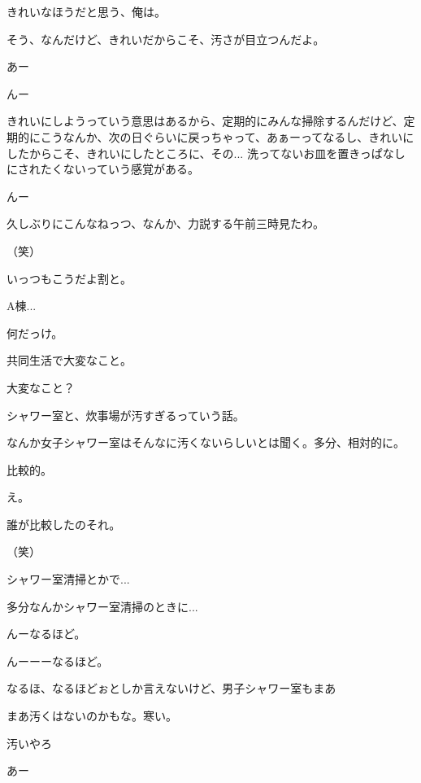 \begin{multicols}{3}
{        きれいなほうだと思う、俺は。

        そう、なんだけど、きれいだからこそ、汚さが目立つんだよ。

        あー

        んー

        きれいにしようっていう意思はあるから、定期的にみんな掃除するんだけど、定期的にこうなんか、次の日ぐらいに戻っちゃって、あぁーってなるし、きれいにしたからこそ、きれいにしたところに、その... 洗ってないお皿を置きっぱなしにされたくないっていう感覚がある。

        んー

        久しぶりにこんなねっつ、なんか、力説する午前三時見たわ。

        （笑）

        いっつもこうだよ割と。

        A棟...

        何だっけ。

        共同生活で大変なこと。

        大変なこと？

        シャワー室と、炊事場が汚すぎるっていう話。

        なんか女子シャワー室はそんなに汚くないらしいとは聞く。多分、相対的に。

        比較的。

        え。

        誰が比較したのそれ。

        （笑）

        シャワー室清掃とかで...

        多分なんかシャワー室清掃のときに...

        んーなるほど。

        んーーーなるほど。

        なるほ、なるほどぉとしか言えないけど、男子シャワー室もまあ

        まあ汚くはないのかもな。寒い。

        汚いやろ

        あー

}
\end{multicols}

